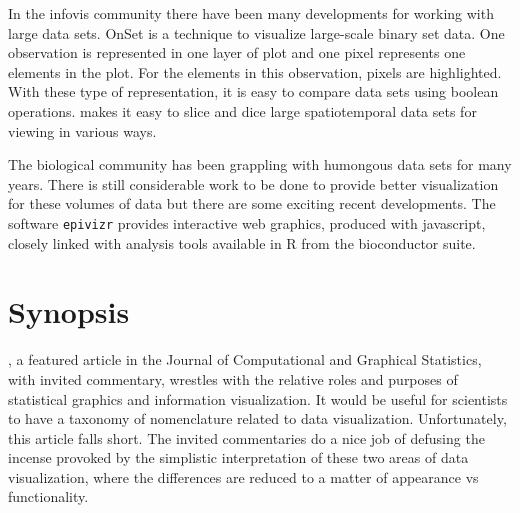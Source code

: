 \documentclass{article}
\begin{document}
In the infovis community there have been many developments for working with large data sets. OnSet \citep{sadana2014onset} is a technique to visualize large-scale binary set data. One observation is represented in one layer of plot and one pixel represents one elements in the plot. For the elements in this observation, pixels are highlighted. With these type of representation, it is easy to compare data sets using boolean operations. \citet{nanocubes} makes it easy to slice and dice large spatiotemporal data sets for viewing in various ways.

The biological community has been grappling with humongous data sets for many years. There is still considerable work to be done to provide better visualization for these volumes of data but there are some exciting recent developments. The software {\tt epivizr} \citep{epivizr} provides interactive web graphics, produced with javascript, closely linked with analysis tools available in R from the bioconductor suite.


	
	

\section{Synopsis}

\citet{gelman2013infovis}, a featured article in the Journal of Computational and Graphical Statistics, with invited commentary, wrestles with the relative roles and purposes of statistical graphics and information visualization. It would be useful for scientists to have a taxonomy of nomenclature related to data visualization. Unfortunately, this article falls short. The invited commentaries do a nice job of defusing the incense provoked by the simplistic interpretation of these two areas of data visualization, where the differences are reduced to a matter of appearance vs functionality.
\end{document}
